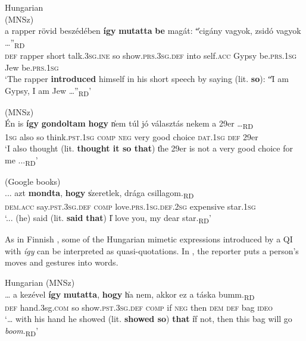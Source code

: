 \documentclass[output=paper,colorlinks,citecolor=brown]{langscibook}
\begin{document}
\ea\label{ex:teptiuk:22} Hungarian\\
\ea\label{ex:teptiuk:22a} (MNSz)\\
\gll a rapper rövid beszédében \textbf{így} \textbf{mutatta} \textbf{be} magát: \|“cigány vagyok, zsidó vagyok …”\|\textsubscript{RD}\\
\textsc{def} rapper short talk.3\textsc{sg}.\textsc{ine} so show.\textsc{prs.3sg.def} into self.\textsc{acc} {\db}{\db}Gypsy be.\textsc{prs.1sg} Jew be.\textsc{prs.1sg}\\
\glt ‘The rapper \textbf{introduced} himself in his short speech by saying (lit. \textbf{so}): \|“I am Gypsy, I am Jew …”\|\textsubscript{RD}’

\ex\label{ex:teptiuk:22b} (MNSz)\\
\gll Én is \textbf{így} \textbf{gondoltam} \textbf{hogy} \|nem túl jó választás nekem a 29er …\|\textsubscript{RD}\\
 1\textsc{sg} also so think.\textsc{pst}.1\textsc{sg} \textsc{comp} {\db}\textsc{neg} very good choice \textsc{dat}.1\textsc{sg} \textsc{def} 29er\\
\glt ‘I also thought (lit. \textbf{thought it so that}) \|the 29er is not a very good choice for me ...\|\textsubscript{RD}’

\ex\label{ex:teptiuk:22c} (Google books)\\
\gll ... azt \textbf{mondta}, \textbf{hogy} \|szeretlek, drága csillagom.\|\textsubscript{RD}\\
{} \textsc{dem.acc} say.\textsc{pst.3sg.def} \textsc{comp} {\db}love.\textsc{prs.1sg.def.2sg} expensive star.\textsc{1sg}\\
\glt ‘... (he) said (lit. \textbf{said} \textbf{that}) \|I love you, my dear star.\|\textsubscript{RD}'
\z
\z

As in Finnish , some of the Hungarian mimetic expressions introduced by a QI with \textit{így} can be interpreted as quasi-quotations. In , the reporter puts a person’s moves and gestures into words.

\ea\label{ex:teptiuk:23} Hungarian (MNSz)\\
\gll … a kezével \textbf{így} \textbf{mutatta}, \textbf{hogy} \|ha nem, akkor ez a táska bumm.\|\textsubscript{RD}\\
{} \textsc{def} hand.3sg.\textsc{com} so show.\textsc{pst.3sg.def} \textsc{comp} {\db}if \textsc{neg} then \textsc{dem} \textsc{def} bag \textsc{ideo}\\
\glt ‘… with his hand he showed (lit. \textbf{showed so}) \textbf{that} \|if not, then this bag will go \textit{boom}.\|\textsubscript{RD}’
\z
\end{document}
